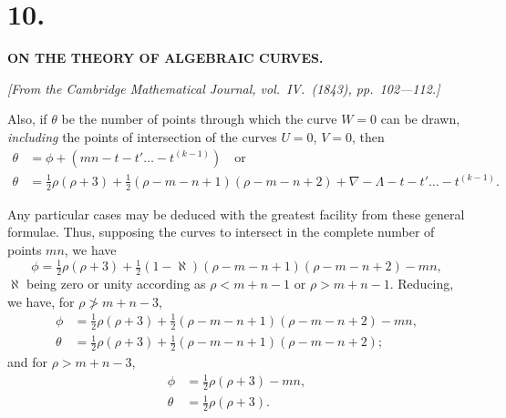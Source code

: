 \documentclass[11pt,a4paper]{book}
\begin{document}
\setlength{\parindent}{1.5em}
\setlength{\parskip}{0pt}
\thispagestyle{empty}
\newpage
\setcounter{page}{53}


\section*{10.}
\begin{center}
\textbf{ON THE THEORY OF ALGEBRAIC CURVES.}
\end{center}
\textit{[From the Cambridge Mathematical Journal, vol.\ IV.\ (1843), pp.\ 102---112.]}

\vspace{6pt}

Also, if $\theta$ be the number of points through which the curve $W=0$ can be drawn,
\textit{including} the points of intersection of the curves $U=0$, $V=0$, then
\begin{align*}
\theta &= \phi + (mn - t - t' \ldots - t^{(k-1)}) \quad\text{or}\\
\theta &= \tfrac{1}{2}\rho(\rho+3) + \tfrac{1}{2}(\rho-m-n+1)(\rho-m-n+2)
+ \nabla - \Lambda - t - t' \ldots - t^{(k-1)} \tag{13}.
\end{align*}

Any particular cases may be deduced with the greatest facility from these general
formulae. Thus, supposing the curves to intersect in the complete number of points $mn$,
we have
\[
\phi = \tfrac{1}{2}\rho(\rho+3) + \tfrac{1}{2}(1-\aleph)(\rho-m-n+1)(\rho-m-n+2) - mn,
\]
$\aleph$ being zero or unity according as $\rho < m+n-1$ or $\rho > m+n-1$.
Reducing, we have, for $\rho \not> m+n-3$,
\begin{align*}
\phi &= \tfrac{1}{2}\rho(\rho+3) + \tfrac{1}{2}(\rho-m-n+1)(\rho-m-n+2) - mn, \\
\theta &= \tfrac{1}{2}\rho(\rho+3) + \tfrac{1}{2}(\rho-m-n+1)(\rho-m-n+2);
\end{align*}
and for $\rho > m+n-3$,
\begin{align*}
\phi &= \tfrac{1}{2}\rho(\rho+3) - mn, \\
\theta &= \tfrac{1}{2}\rho(\rho+3).
\end{align*}
\end{document}
